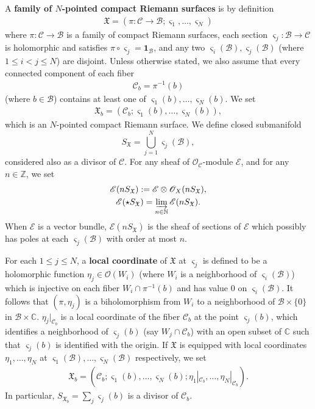 \documentclass[12pt,a4paper,notitlepage]{article}
\theoremstyle{definition}
\theoremstyle{plain}
\newcommand{\fk}{\mathfrak}
\newcommand{\mc}{\mathcal}
\newcommand{\id}{\mathbf{1}}
\newcommand{\scr}{\mathscr}
\newcommand{\sgm}{\varsigma}
\newcommand{\SX}{{S_{\fk X}}}
\newcommand{\Cbb}{\mathbb C}
\newcommand{\Nbb}{\mathbb N}
\newcommand{\Zbb}{\mathbb Z}
\numberwithin{equation}{section}
\begin{document}
A \textbf{family of $N$-pointed compact Riemann surfaces} is by definition
\begin{align}
	\fk X=(\pi:\mc C\rightarrow\mc B;\sgm_1,\dots,\sgm_N)\label{eq2}	
\end{align}
where $\pi:\mc C\rightarrow\mc B$ is a family of compact Riemann surfaces, each section $\sgm_j:\mc B\rightarrow\mc C$ is holomorphic and satisfies $\pi\circ\sgm_j=\id_{\mc B}$, and any two $\sgm_i(\mc B),\sgm_j(\mc B)$ (where $1\leq i<j\leq N$) are disjoint. Unless otherwise stated, we also assume that every connected component of each fiber \index{CbXb@$\mc C_b,\fk X_b$}
\begin{align*}
	\mc C_b=\pi^{-1}(b)	
\end{align*}
(where $b\in\mc B$) contains at least one of $\sgm_1(b),\dots,\sgm_N(b)$. We set
\begin{align*}
	\fk X_b=(\mc C_b;\sgm_1(b),\dots,\sgm_N(b)),	
\end{align*}
which is an $N$-pointed compact Riemann surface. We define closed submanifold \index{SX@$\SX$}
\begin{equation*}
	\SX=\bigcup_{j=1}^N\sgm_j(\mc B),	
\end{equation*}
considered also as a divisor of $\mc C$. For any sheaf of $\scr O_{\mc C}$-module $\scr E$, and for any $n\in\Zbb$, we set \index{ES@$\scr E(n\SX),\scr E(\star\SX)$}
\begin{gather*}
	\scr E(n\SX):=\scr E\otimes\scr O_X(n\SX),\\
	\scr E(\star\SX)=\varinjlim_{n\in\Nbb}\scr E(n\SX).
\end{gather*}
When $\scr E$ is a vector bundle, $\scr E(n\SX)$ is the sheaf of sections of $\scr E$ which possibly has poles at each $\sgm_j(\mc B)$ with order at most $n$. 




For each $1\leq j\leq N$, a \textbf{local coordinate} of $\fk X$ at $\sgm_j$ is defined to be a holomorphic function $\eta_j\in\scr O(W_i)$ (where $W_i$ is a neighborhood of $\sgm_i(\mc B)$) which is injective on each fiber $W_i\cap\pi^{-1}(b)$ and has value $0$ on $\sgm_i(\mc B)$. It follows that $(\pi,\eta_j)$ is a biholomorphism from $W_i$ to a neighborhood of $\mc B\times\{0\}$ in $\mc B\times\Cbb$. $\eta_j|_{\mc C_b}$ is a local coordinate of the fiber $\mc C_b$ at the point $\sgm_j(b)$, which identifies a neighborhood  of $\sgm_j(b)$ (say $W_j\cap\mc C_b$) with an open subset of $\Cbb$ such that $\sgm_j(b)$ is identified with the origin. If $\fk X$ is equipped with local coordinates $\eta_1,\dots,\eta_N$ at $\sgm_1(\mc B),\dots,\sgm_N(\mc B)$ respectively, we set
\begin{align*}
\fk X_b=(\mc C_b;\sgm_1(b),\dots,\sgm_N(b);\eta_1|_{\mc C_b},\dots,\eta_N|_{\mc C_b}).	
\end{align*}
In particular, $S_{\fk X_b}=\sum_j\sgm_j(b)$ is a divisor of $\mc C_b$.
\end{document}
